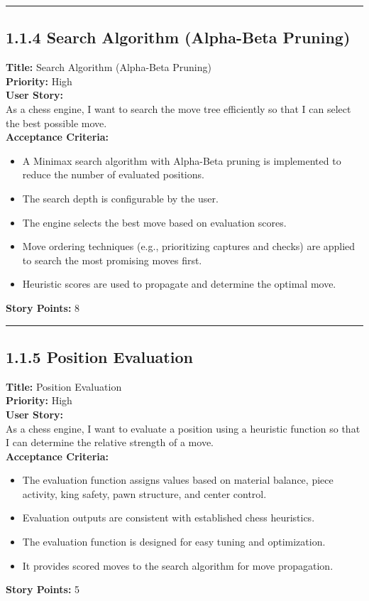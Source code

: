 \documentclass[12pt]{article}
\begin{document}
\bigskip
\hrule
\bigskip

\subsection{1.1.4 Search Algorithm (Alpha-Beta Pruning)}
\textbf{Title:} Search Algorithm (Alpha-Beta Pruning)\\
\textbf{Priority:} High\\
\textbf{User Story:}\\
As a chess engine, I want to search the move tree efficiently so that I can select the best possible move.\\
\textbf{Acceptance Criteria:}
\begin{itemize}
    \item A Minimax search algorithm with Alpha-Beta pruning is implemented to reduce the number of evaluated positions.
    \item The search depth is configurable by the user.
    \item The engine selects the best move based on evaluation scores.
    \item Move ordering techniques (e.g., prioritizing captures and checks) are applied to search the most promising moves first.
    \item Heuristic scores are used to propagate and determine the optimal move.
\end{itemize}
\textbf{Story Points:} 8

\bigskip
\hrule
\bigskip

\subsection{1.1.5 Position Evaluation}
\textbf{Title:} Position Evaluation\\
\textbf{Priority:} High\\
\textbf{User Story:}\\
As a chess engine, I want to evaluate a position using a heuristic function so that I can determine the relative strength of a move.\\
\textbf{Acceptance Criteria:}
\begin{itemize}
    \item The evaluation function assigns values based on material balance, piece activity, king safety, pawn structure, and center control.
    \item Evaluation outputs are consistent with established chess heuristics.
    \item The evaluation function is designed for easy tuning and optimization.
    \item It provides scored moves to the search algorithm for move propagation.
\end{itemize}
\textbf{Story Points:} 5
\end{document}
